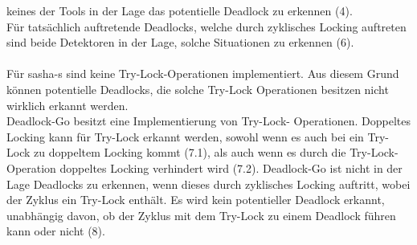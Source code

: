 keines der Tools in der Lage das potentielle Deadlock zu erkennen (4).\\
Für tatsächlich auftretende Deadlocks, welche durch zyklisches Locking auftreten 
sind beide Detektoren in der Lage, solche Situationen zu erkennen (6).\\\\
Für sasha-s sind keine Try-Lock-Operationen implementiert. Aus diesem Grund 
können potentielle Deadlocks, die solche Try-Lock Operationen besitzen nicht 
wirklich erkannt werden.\\Deadlock-Go besitzt eine Implementierung von Try-Lock-
Operationen. Doppeltes Locking kann für Try-Lock erkannt werden, sowohl wenn 
es auch bei ein Try-Lock zu doppeltem Locking kommt (7.1), als auch wenn es
durch die Try-Lock-Operation doppeltes Locking verhindert wird (7.2). Deadlock-Go
ist nicht in der Lage Deadlocks zu erkennen, wenn dieses durch zyklisches Locking 
auftritt, wobei der Zyklus ein Try-Lock enthält. Es wird kein potentieller
Deadlock erkannt, unabhängig davon, ob der Zyklus mit dem Try-Lock zu einem  
Deadlock führen kann oder nicht (8).


